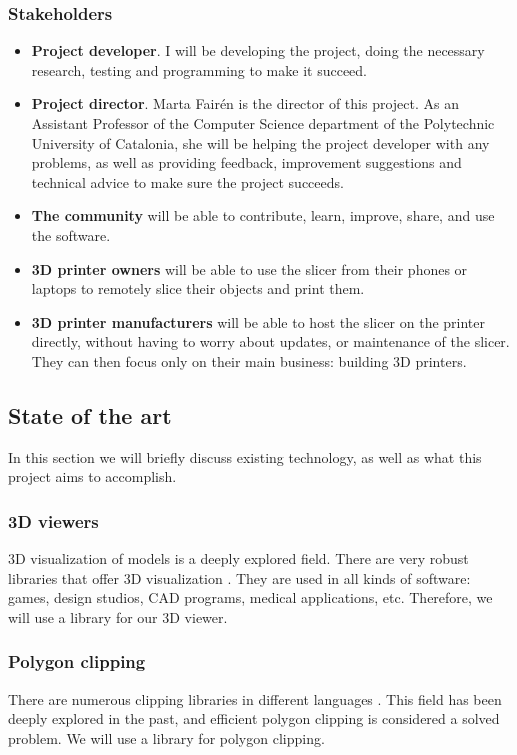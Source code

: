 \subsubsection{Stakeholders}
\begin{itemize}
    \item \textbf{Project developer}. I will be developing the project, doing the necessary research, testing and programming to make it succeed.
    \item \textbf{Project director}. Marta Fairén is the director of this project. As an Assistant Professor of the Computer Science department of the Polytechnic University of Catalonia, she will be helping the project developer with any problems, as well as providing feedback, improvement suggestions and technical advice to make sure the project succeeds.
    \item \textbf{The community} will be able to contribute, learn, improve, share, and use the software.
    \item \textbf{3D printer owners}  will be able to use the slicer from their phones or laptops to remotely slice their objects and print them.
    \item \textbf{3D printer manufacturers} will be able to host the slicer on the printer directly, without having to worry about updates, or maintenance of the slicer. They can then focus only on their main business: building 3D printers.
\end{itemize}

\subsection{State of the art}
In this section we will briefly discuss existing technology, as well as what this project aims to accomplish.

\subsubsection{3D viewers}
3D visualization of models is a deeply explored field. There are very robust libraries that offer 3D visualization \cite{gh:threejs}. They are used in all kinds of software: games, design studios, CAD programs, medical applications, etc. Therefore, we will use a library for our 3D viewer.

\subsubsection{Polygon clipping}
There are numerous clipping libraries in different languages \cite{gh:clipper-lib, gh:clipper, gh:lineclip}. This field has been deeply explored in the past, and efficient polygon clipping is considered a solved problem. We will use a library for polygon clipping.

